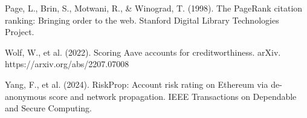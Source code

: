 \hangindent=0.5in  Page, L., Brin, S., Motwani, R., \& Winograd, T. (1998). The PageRank citation ranking: Bringing order to the web. Stanford Digital Library Technologies Project.\par

\hangindent=0.5in  Wolf, W., et al. (2022). Scoring Aave accounts for creditworthiness. arXiv. https://arxiv.org/abs/2207.07008\par

\hangindent=0.5in  Yang, F., et al. (2024). RiskProp: Account risk rating on Ethereum via de-anonymous score and network propagation. IEEE Transactions on Dependable and Secure Computing.\par

